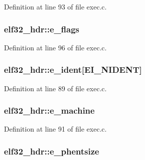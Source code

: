 Definition at line 93 of file exec.\+c.

\hypertarget{structelf32__hdr_a8695845266a8825d6cc9c04205c783f5}{
\subsubsection[{e\+\_\+flags}]{ elf32\+\_\+hdr\+::e\+\_\+flags}}\label{structelf32__hdr_a8695845266a8825d6cc9c04205c783f5}


Definition at line 96 of file exec.\+c.

\hypertarget{structelf32__hdr_a47cad02c87b35eab4d8fda5f3f0fefd4}{
\subsubsection[{e\+\_\+ident}]{ elf32\+\_\+hdr\+::e\+\_\+ident\mbox{[}{\bf E\+I\+\_\+\+N\+I\+D\+E\+N\+T}\mbox{]}}}\label{structelf32__hdr_a47cad02c87b35eab4d8fda5f3f0fefd4}


Definition at line 89 of file exec.\+c.

\hypertarget{structelf32__hdr_ac683164e0380f6babe3f46a3a1ffdfe9}{
\subsubsection[{e\+\_\+machine}]{ elf32\+\_\+hdr\+::e\+\_\+machine}}\label{structelf32__hdr_ac683164e0380f6babe3f46a3a1ffdfe9}


Definition at line 91 of file exec.\+c.

\hypertarget{structelf32__hdr_a7c8f7ea4bb2789905be6dc875c1e502d}{
\subsubsection[{e\+\_\+phentsize}]{ elf32\+\_\+hdr\+::e\+\_\+phentsize}}\label{structelf32__hdr_a7c8f7ea4bb2789905be6dc875c1e502d}



